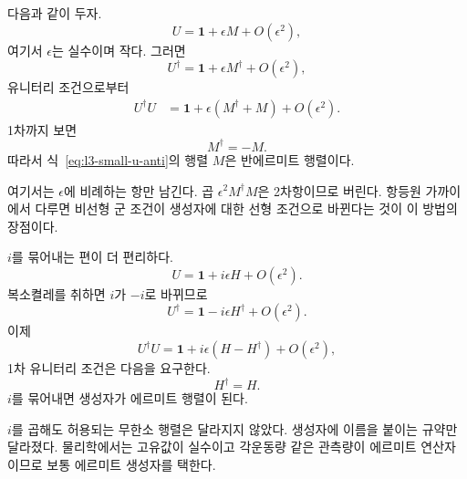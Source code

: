다음과 같이 두자.
\begin{equation}
U=\boldsymbol 1+\epsilon M+O(\epsilon^2),
\label{eq:l3-small-u-anti}
\end{equation}
여기서 \(\epsilon\)는 실수이며 작다. 그러면
\begin{equation}
U^\dagger=\boldsymbol 1+\epsilon M^\dagger+O(\epsilon^2),
\end{equation}
유니터리 조건으로부터
\begin{align}
U^\dagger U
 &=\boldsymbol 1+\epsilon(M^\dagger+M)+O(\epsilon^2).
\end{align}
1차까지 보면
\begin{equation}
M^\dagger=-M.
\end{equation}
따라서 식~\eqref{eq:l3-small-u-anti}의 행렬 \(M\)은 반에르미트 행렬이다.

여기서는 \(\epsilon\)에 비례하는 항만 남긴다. 곱 \(\epsilon^2M^\dagger M\)은 2차항이므로 버린다. 항등원 가까이에서 다루면 비선형 군 조건이 생성자에 대한 선형 조건으로 바뀐다는 것이 이 방법의 장점이다.

\(i\)를 묶어내는 편이 더 편리하다.
\begin{equation}
U=\boldsymbol 1+i\epsilon H+O(\epsilon^2).
\label{eq:l3-small-u-herm}
\end{equation}
복소켤레를 취하면 \(i\)가 \(-i\)로 바뀌므로
\begin{equation}
U^\dagger=\boldsymbol 1-i\epsilon H^\dagger+O(\epsilon^2).
\end{equation}
이제
\begin{equation}
U^\dagger U
=\boldsymbol 1+i\epsilon(H-H^\dagger)+O(\epsilon^2),
\end{equation}
1차 유니터리 조건은 다음을 요구한다.
\begin{equation}
H^\dagger=H.
\end{equation}
\(i\)를 묶어내면 생성자가 에르미트 행렬이 된다.

\(i\)를 곱해도 허용되는 무한소 행렬은 달라지지 않았다. 생성자에 이름을 붙이는 규약만 달라졌다. 물리학에서는 고유값이 실수이고 각운동량 같은 관측량이 에르미트 연산자이므로 보통 에르미트 생성자를 택한다.

